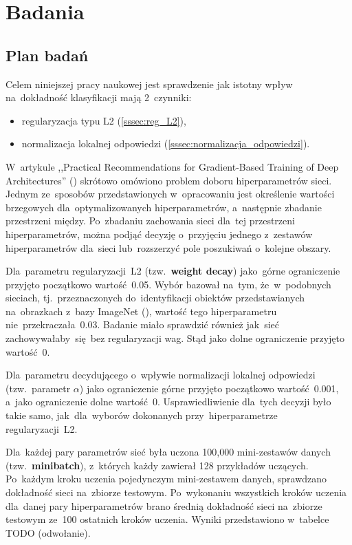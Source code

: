 \chapter{Badania}

\section{Plan badań}
Celem niniejszej pracy naukowej jest sprawdzenie jak istotny wpływ na~dokładność klasyfikacji mają 2~czynniki:
\begin{itemize}
    \item regularyzacja typu L2 (\ref{sssec:reg_L2}),
    \item normalizacja lokalnej odpowiedzi (\ref{sssec:normalizacja_odpowiedzi}).
\end{itemize}

W~artykule ,,Practical Recommendations for Gradient-Based Training of Deep Architectures''
(\cite{practical-gradient-based}) skrótowo omówiono problem doboru hiperparametrów sieci. Jednym ze~sposobów
przedstawionych w~opracowaniu jest określenie wartości brzegowych dla~optymalizowanych hiperparametrów,
a~następnie zbadanie przestrzeni między. Po~zbadaniu zachowania sieci dla~tej przestrzeni hiperparametrów, można podjąć
decyzję o~przyjęciu jednego z~zestawów hiperparametrów dla~sieci lub~rozszerzyć pole poszukiwań o~kolejne obszary.

Dla~parametru regularyzacji~L2 (tzw.~\textbf{weight decay}) jako~górne ograniczenie przyjęto początkowo wartość~0.05.
Wybór bazował na~tym, że~w~podobnych sieciach, tj.~przeznaczonych do~identyfikacji obiektów przedstawianych na~obrazkach
z~bazy ImageNet (\cite{imagenet}), wartość tego hiperparametru nie~przekraczała~0.03. Badanie miało sprawdzić
również jak~sieć zachowywałaby~się~bez regularyzacji wag. Stąd jako dolne ograniczenie przyjęto wartość~0.

Dla~parametru decydującego o~wpływie normalizacji lokalnej odpowiedzi (tzw.~parametr $\alpha$) jako ograniczenie górne
przyjęto początkowo wartość~0.001, a~jako ograniczenie dolne wartość~0. Usprawiedliwienie dla~tych decyzji było
takie samo, jak~dla~wyborów dokonanych przy~hiperparametrze regularyzacji~L2.

Dla~każdej pary parametrów sieć była uczona 100,000 mini-zestawów danych (tzw.~\textbf{minibatch}), z~których
każdy zawierał 128 przykładów uczących. Po~każdym kroku uczenia pojedynczym mini-zestawem danych, sprawdzano
dokładność sieci na~zbiorze testowym. Po~wykonaniu wszystkich kroków uczenia dla~danej pary hiperparametrów
brano średnią dokładność sieci na~zbiorze testowym ze~100 ostatnich kroków uczenia. Wyniki przedstawiono w~tabelce
 TODO (odwołanie).

